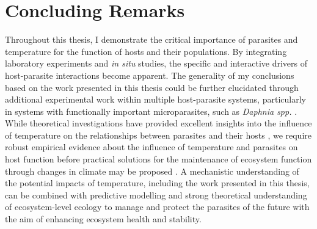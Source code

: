 \section{Concluding Remarks}

Throughout this thesis, I demonstrate the critical importance of parasites and temperature for the function of hosts and their populations. By integrating laboratory experiments and \emph{in situ} studies, the specific and interactive drivers of host-parasite interactions become apparent. The generality of my conclusions based on the work presented in this thesis could be further elucidated through additional experimental work within multiple host-parasite systems, particularly in systems with functionally important microparasites, such as \emph{Daphnia spp.} \citep{johnson2006, kirk2018}. While theoretical investigations have provided excellent insights into the influence of temperature on the relationships between parasites and their hosts \citep{barber2016, cohen2017, gehman2018}, we require robust empirical evidence about the influence of temperature and parasites on host function before practical solutions for the maintenance of ecosystem function through changes in climate may be proposed \citep{rohr2011, altizer2013}. A mechanistic understanding of the potential impacts of temperature, including the work presented in this thesis, can be combined with predictive modelling and strong theoretical understanding of ecosystem-level ecology to manage and protect the parasites of the future with the aim of enhancing ecosystem health and stability. 


%